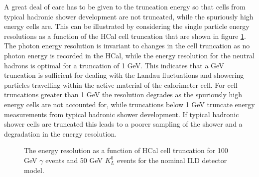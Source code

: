 A great deal of care has to be given to the truncation energy so that cells from typical hadronic shower development are not truncated, while the spuriously high energy cells are.  This can be illustrated by considering the single particle energy resolutions as a function of the HCal cell truncation that are shown in figure \ref{fig:ercelltrunc}.  The photon energy resolution is invariant to changes in the cell truncation as no photon energy is recorded in the HCal, while the energy resolution for the neutral hadrons is optimal for a truncation of 1 GeV.  This indicates that a  GeV truncation is sufficient for dealing with the Landau fluctuations and showering particles travelling within the active material of the calorimeter cell.  For cell truncations greater than 1 GeV the resolution degrades as the spuriously high energy cells are not accounted for, while truncations below 1 GeV truncate energy measurements from typical hadronic shower development.  If typical hadronic shower cells are truncated this leads to a poorer sampling of the shower and a degradation in the energy resolution.  

\begin{figure}
\caption[The energy resolution as a function of HCal cell truncation for \protect{} 100 GeV $\gamma$ events and \protect{} 50 GeV $K^{0}_{L}$ events for the nominal ILD detector model.]{The energy resolution as a function of HCal cell truncation for \protect{} 100 GeV $\gamma$ events and \protect{} 50 GeV $K^{0}_{L}$ events for the nominal ILD detector model.}
\label{fig:ercelltrunc}
\end{figure}

